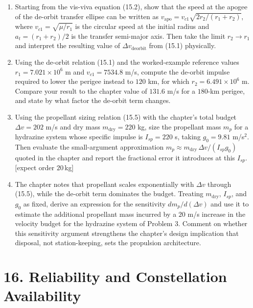 \documentclass[
  11pt,
  openany,
  oneside]{book}
\begin{document}
\begin{enumerate}
\def\labelenumi{\arabic{enumi}.}
\item
  Starting from the vis-viva equation (15.2), show that the speed at the
  apogee of the de-orbit transfer ellipse can be written as
  \(v_{\mathrm{apo}} = v_{c1}\sqrt{2 r_2/(r_1 + r_2)}\), where
  \(v_{c1} = \sqrt{\mu/r_1}\) is the circular speed at the initial
  radius and \(a_t = (r_1 + r_2)/2\) is the transfer semi-major axis.
  Then take the limit \(r_2 \to r_1\) and interpret the resulting value
  of \(\Delta v_{\mathrm{deorbit}}\) from (15.1) physically.
\item
  Using the de-orbit relation (15.1) and the worked-example reference
  values \(r_1 = 7.021\times10^6\) m and \(v_{c1} = 7534.8\) m/s,
  compute the de-orbit impulse required to lower the perigee instead to
  \(120\) km, for which \(r_2 = 6.491\times10^6\) m. Compare your result
  to the chapter value of \(131.6\) m/s for a \(180\)-km perigee, and
  state by what factor the de-orbit term changes.
\item
  Using the propellant sizing relation (15.5) with the chapter's total
  budget \(\Delta v = 202\) m/s and dry mass \(m_{\mathrm{dry}} = 220\)
  kg, size the propellant mass \(m_p\) for a hydrazine system whose
  specific impulse is \(I_{sp} = 220\) s, taking \(g_0 = 9.81\)
  m/s\(^2\). Then evaluate the small-argument approximation
  \(m_p \approx m_{\mathrm{dry}}\,\Delta v/(I_{sp} g_0)\) quoted in the
  chapter and report the fractional error it introduces at this
  \(I_{sp}\). {[}expect order \(20\,\)kg{]}
\item
  The chapter notes that propellant scales exponentially with
  \(\Delta v\) through (15.5), while the de-orbit term dominates the
  budget. Treating \(m_{\mathrm{dry}}\), \(I_{sp}\), and \(g_0\) as
  fixed, derive an expression for the sensitivity \(dm_p/d(\Delta v)\)
  and use it to estimate the additional propellant mass incurred by a
  \(20\) m/s increase in the velocity budget for the hydrazine system of
  Problem 3. Comment on whether this sensitivity argument strengthens
  the chapter's design implication that disposal, not station-keeping,
  sets the propulsion architecture.
\end{enumerate}

\chapter{16. Reliability and Constellation
Availability}\label{reliability-and-constellation-availability}
\end{document}
